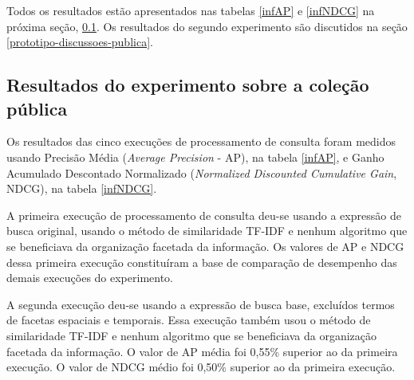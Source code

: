 Todos os resultados estão apresentados nas tabelas \ref{infAP} e \ref{infNDCG} na próxima seção, \ref{prototipo-resultados-publica}. Os resultados do segundo experimento são discutidos na seção \ref{prototipo-discussoes-publica}.





















\subsection{Resultados do experimento sobre a coleção pública}
\label{prototipo-resultados-publica}

Os resultados das cinco execuções de processamento de consulta foram medidos usando Precisão Média (\textit{Average Precision} - AP), na tabela \ref{infAP}, e Ganho Acumulado Descontado Normalizado (\textit{Normalized Discounted Cumulative Gain}, NDCG), na tabela \ref{infNDCG}.

A primeira execução de processamento de consulta deu-se usando a expressão de busca original, usando o método de similaridade TF-IDF e nenhum algoritmo que se beneficiava da organização facetada da informação. Os valores de AP e NDCG dessa primeira execução constituíram a base de comparação de desempenho das demais execuções do experimento.

A segunda execução deu-se usando a expressão de busca base, excluídos termos de facetas espaciais e temporais. Essa execução também usou o método de similaridade TF-IDF e nenhum algoritmo que se beneficiava da organização facetada da informação. O valor de AP média foi 0,55\% superior ao da primeira execução. O valor de NDCG médio foi 0,50\% superior ao da primeira execução. 

